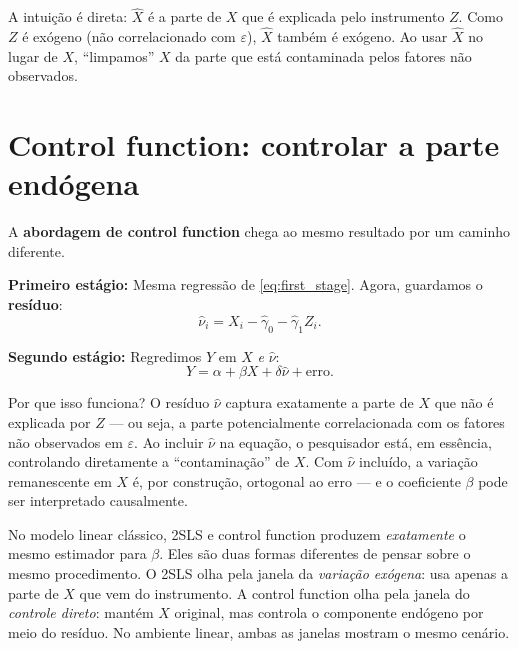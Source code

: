 A intuição é direta: $\hat{X}$ é a parte de $X$ que é explicada pelo instrumento $Z$.
Como $Z$ é exógeno (não correlacionado com $\varepsilon$), $\hat{X}$ também é exógeno.
Ao usar $\hat{X}$ no lugar de $X$, ``limpamos'' $X$ da parte que está contaminada
pelos fatores não observados.

\section*{Control function: controlar a parte endógena}

A \textbf{abordagem de control function} chega ao mesmo resultado por um caminho
diferente.

\textbf{Primeiro estágio:} Mesma regressão de \eqref{eq:first_stage}. Agora, guardamos
o \textbf{resíduo}:
\begin{equation}
\hat{\nu}_i = X_i - \hat{\gamma}_0 - \hat{\gamma}_1 Z_i.
\end{equation}

\textbf{Segundo estágio:} Regredimos $Y$ em $X$ \emph{e} $\hat{\nu}$:
\begin{equation}
Y = \alpha + \beta X + \delta \hat{\nu} + \text{erro}.
\label{eq:cf_linear}
\end{equation}

Por que isso funciona? O resíduo $\hat{\nu}$ captura exatamente a parte de $X$ que
não é explicada por $Z$ --- ou seja, a parte potencialmente correlacionada com os
fatores não observados em $\varepsilon$. Ao incluir $\hat{\nu}$ na equação, o
pesquisador está, em essência, controlando diretamente a ``contaminação'' de $X$.
Com $\hat{\nu}$ incluído, a variação remanescente em $X$ é, por construção, ortogonal
ao erro --- e o coeficiente $\beta$ pode ser interpretado causalmente.

\begin{destacebox}
No modelo linear clássico, 2SLS e control function produzem \emph{exatamente} o mesmo
estimador para $\beta$. Eles são duas formas diferentes de pensar sobre o mesmo
procedimento. O 2SLS olha pela janela da \emph{variação exógena}: usa apenas a parte
de $X$ que vem do instrumento. A control function olha pela janela do \emph{controle
direto}: mantém $X$ original, mas controla o componente endógeno por meio do resíduo.
No ambiente linear, ambas as janelas mostram o mesmo cenário.
\end{destacebox}

